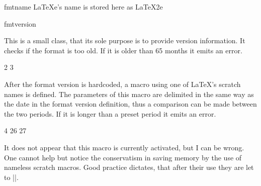 \begin{docCommand}{fmtname}{}
LaTeXe's name is stored here as LaTeX2e
\begin{docCommand}{fmtversion}{}
\end{docCommand}
This is a small class,  that its sole purpose is to provide version information. It checks
if the format is too old. If it is older than 65 months it emits an error. 
\end{docCommand}



\begin{teXXX}
2 \def\fmtname{LaTeX2e}
3 \edef\fmtversion{2011/06/27}
\end{teXXX}

After the format version is hardcoded, a macro using one of LaTeX's scratch names is defined. The parameters
of this macro are delimited in the same way as the date in the format version definition, thus a comparison can be made between the two periods. If it is longer than a preset period it emits an error.

\begin{teXXX}
4 \iffalse
5 \def\reserved@a#1/#2/#3\@nil{%
6   \count@\year
7   \advance\count@-#1\relax
8   \multiply\count@ by 12\relax
9   \advance\count@\month
10 \advance\count@-#2\relax}
11 \expandafter\reserved@a\fmtversion\@nil
12 \ifnum\count@>65
13     \typeout{^^J%
14     !!!!!!!!!!!!!!!!!!!!!!!!!!!!!!!!!!!!!!!!!!!!!!!^^J%
15     ! You are attempting to make a LaTeX format from a source file^^J%
16     ! That is more than five years old.^^J%
17     !^^J%
18     ! If you enter <return> to scroll past this message then the format^^J%
19     ! will be built, but please consider obtaining newer source files^^J%
20     ! before continuing to build LaTeX.^^J%
21     !!!!!!!!!!!!!!!!!!!!!!!!!!!!!!!!!!!!!!!!!!!!!!!!^^J%
22     }
23     \errhelp{To avoid this error message, obtain new LaTeX sources.}
24     \errmessage{LaTeX source files more than 5 years old!}
25 \fi
26 \let\reserved@a\relax
27 \fi
\end{teXXX}

It does not appear that this macro is currently activated, but I can be wrong. One cannot help but notice the conservatism in saving memory by the use of nameless scratch macros. Good practice dictates, that after their use they are let to |\relax|.

\begin{texexample}{}{}
\fmtname  [\fmtversion]
\end{texexample}


